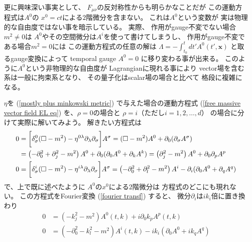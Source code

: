 更に興味深い事実として、
$F_{\mu \nu}$の反対称性からも明らかなことだが
この運動方程式は$A^0$の
$x^0 = ct$による$2$階微分を含まない。
これは$A^0$という変数が
実は物理的な自由度ではない事を暗示している。
実際、
作用がgauge不変でない場合$m^2 \neq 0$は
$A^0$やその空間微分は$A^i$を使って書けてしまうし、
作用がgauge不変である場合$m^2 = 0$には
この運動方程式の任意の解は
$\displaystyle
    \Lambda =
    - \int_{t_0}^t dt'
        A^0(t', \bm{x})$
と取るgauge変換によって
temporal gauge $A^0 = 0$
に移り変わる事が出来る。
このように$A^0$という非物理的な自由度が
Lagrangianに現れる事により
vector場を含む系は一般に拘束系となり、
その量子化はscalar場の場合と比べて
格段に複雑になる。

$\eta$を
(\ref{mostly plus minkowski metric})
で与えた場合の運動方程式
(\ref{free massive vector field EL eq})
を、$\rho = 0$の場合と
$\rho = i$（ただし$i = 1, 2, \dots, d$）
の場合に分けて実際に解いてみよう。
解きたい方程式は
\begin{subequations}
\begin{align}
    0
&=
    \bigg[
        \delta^0_\sigma
        (\Box - m^2)
    -
        \eta^{0 \lambda}
        \partial_\lambda
        \partial_\sigma
    \bigg]
    A^\sigma
=
    (\Box - m^2)
    A^0
+
    \partial_0
    (\partial_\sigma A^\sigma)
\notag\\&
=
    \left(
        - \partial_0^2
        + \partial_j^2
        - m^2
    \right)
    A^0
+
    \partial_0
    (\partial_0 A^0
    + \partial_k A^k)
=
    \left(
        \partial_j^2
        - m^2
    \right)
    A^0
+
    \partial_0
    \partial_p A^p
\\
    0
&=
    \bigg[
        \delta^i_\sigma
        (\Box - m^2)
    -
        \eta^{i \lambda}
        \partial_\lambda
        \partial_\sigma
    \bigg]
    A^\sigma
=
    \left(
        - \partial_0^2
        + \partial_l^2
        - m^2
    \right)
    A^i
-
    \partial_i
    (\partial_0 A^0
    + \partial_q A^q)
\end{align}
\end{subequations}
で、上で既に述べたように
$A^0$の$x^0$による$2$階微分は
方程式のどこにも現れない。
この方程式をFourier変換
(\ref{fourier transf})
すると、
微分$\partial_i$は$i k_i$倍に置き換わり
\begin{subequations}
\begin{align}
    0
&=
    \left(
        - k_j^2
        - m^2
    \right)
    A^0 (t, k)
+
    i \partial_0
    k_p A^p (t, k)
\label{fourier transf of vector eom; time component}
\\
    0
&=
    \left(
        - \partial_0^2
        - k_l^2
        - m^2
    \right)
    A^i (t, k)
-
    i k_i
    (\partial_0 A^0
    + i k_q A^q)
\end{align}
\end{subequations}
